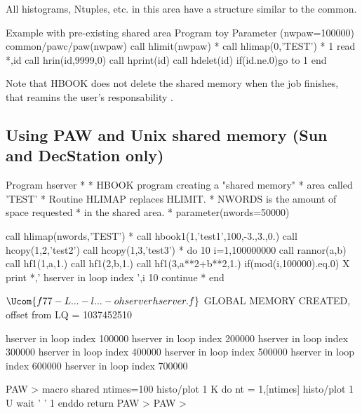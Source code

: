 All histograms, Ntuples, etc. in this area have a structure
similar to the  common.

\begin{XMPt}{Example with pre-existing shared area}
      Program toy
      Parameter (nwpaw=100000)
      common/pawc/paw(nwpaw)
      call hlimit(nwpaw)
*
      call hlimap(0,'TEST')
*
   1  read *,id
      call hrin(id,9999,0)
      call hprint(id)
      call hdelet(id)
      if(id.ne.0)go to 1
      end
\end{XMPt}

Note that HBOOK does not delete the shared memory when the job
finishes, that reamins the user's responsability .

\newpage

\subsection{Using PAW and Unix shared memory (Sun and DecStation only)}
\label{sec:unixpresenter}
 
\begin{minipage}{.48\textwidth}
\begin{XMP}
      Program hserver
*
*     HBOOK program creating a "shared memory" 
*     area called 'TEST'
*     Routine HLIMAP replaces HLIMIT.
*     NWORDS is the amount of space requested 
*     in the shared area.
*
      parameter(nwords=50000)

      call hlimap(nwords,'TEST')
*
      call hbook1(1,'test1',100,-3.,3.,0.)
      call hcopy(1,2,'test2')
      call hcopy(1,3,'test3')
*
      do 10 i=1,100000000
         call rannor(a,b)
         call hf1(1,a,1.)
         call hf1(2,b,1.)
         call hf1(3,a**2+b**2,1.)
         if(mod(i,100000).eq.0)
     X   print *,' hserver in loop index ',i
  10  continue
*
      end

$ \Ucom{f77 -L... -l... -ohserver hserver.f}

$ 
GLOBAL MEMORY CREATED, 
        offset from LQ =  1037452510

 hserver in loop index   100000
 hserver in loop index   200000
 hserver in loop index   300000
 hserver in loop index   400000
 hserver in loop index   500000
 hserver in loop index   600000
 hserver in loop index   700000
 
\end{XMP}
\end{minipage}\hfill
\begin{minipage}{.50\textwidth}
\begin{XMP}
    PAW > 
        macro shared ntimes=100
        histo/plot 1 K
        do nt = 1,[ntimes]
           histo/plot 1 U
           wait ' ' 1
        enddo
        return
    PAW > 
    PAW > 
\end{XMP}
\begin{Fighere}
\caption{Visualise histograms in Unix shared memory}
\label{fig:unixshared}
\end{Fighere}
\end{minipage}
 
